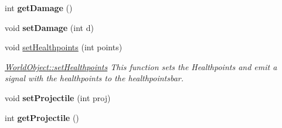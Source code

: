\begin{DoxyCompactItemize}
\item 
int {\bfseries get\+Damage} ()\hypertarget{class_world_object_ab391ed4eceba196caf01860868640f95}{}\label{class_world_object_ab391ed4eceba196caf01860868640f95}

\item 
void {\bfseries set\+Damage} (int d)\hypertarget{class_world_object_a62cc2d1b031251c40343d2b453acbd3a}{}\label{class_world_object_a62cc2d1b031251c40343d2b453acbd3a}

\item 
void \hyperlink{class_world_object_a2ad8e7e458a573830f1609f4d9d3eacf}{set\+Healthpoints} (int points)
\begin{DoxyCompactList}\small\item\em \hyperlink{class_world_object_a2ad8e7e458a573830f1609f4d9d3eacf}{World\+Object\+::set\+Healthpoints} This function sets the Healthpoints and emit a signal with the healthpoints to the healthpointsbar. \end{DoxyCompactList}\item 
void {\bfseries set\+Projectile} (int proj)\hypertarget{class_world_object_a58f877e00d7a0a05af52939e5e07c441}{}\label{class_world_object_a58f877e00d7a0a05af52939e5e07c441}

\item 
int {\bfseries get\+Projectile} ()\hypertarget{class_world_object_ae5736660e64943d305f1a400bd8f0173}{}\label{class_world_object_ae5736660e64943d305f1a400bd8f0173}


\end{DoxyCompactItemize}
